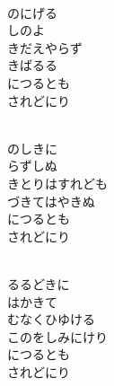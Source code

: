 \documentclass[10pt,b5j]{tarticle} %
\begin{document}
\vspace{1.5em} %
\newcommand{\linespace}{0.5em} %
\newcommand{\blocksize}{0.5\hsize} %
\newcommand{\itemmargin}{6em} %
\begin{enumerate} %
    \setlength{\itemindent}{\itemmargin} %
    \begin{minipage}[c]{\blocksize}
    
        \vspace{\linespace}
        \item~\\
        のにげる\\
        しのよ\\
        きだえやらず\\
        きばるる\\
        につるとも\\
        されどにり
        
        \vspace{\linespace}
        \item~\\
        のしきに\\
        らずしぬ\\
        きとりはすれども\\
        づきてはやきぬ\\
        につるとも\\
        されどにり
        
        \vspace{\linespace}
        \item~\\
        るるどきに\\
        はかきて\\
        むなくひゆける\\
        このをしみにけり\\
        につるとも\\
        されどにり
        

\end{minipage}
\end{enumerate}
\end{document}
